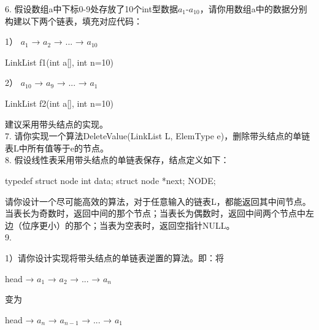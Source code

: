 \begin{exercise}
6. 假设数组a中下标0-9处存放了10个int型数据\(a_1\)-\(a_{10}\)，请你用数组a中的数据分别构建以下两个链表，填充对应代码：

1） \(a_1\) → \(a_2\) → ... → \(a_{10}\)
\begin{cppcode}
    LinkList f1(int a[], int n=10) {

    }
\end{cppcode}
2） \(a_{10}\) → \(a_9\) → ... → \(a_1\)
\begin{cppcode}
    LinkList f2(int a[], int n=10) {

    }
\end{cppcode}
建议采用带头结点的实现。\\

7. 请你实现一个算法DeleteValue(LinkList L, ElemType e)，删除带头结点的单链表L中所有值等于e的节点。\\





8. 假设线性表采用带头结点的单链表保存，结点定义如下：
\begin{cppcode}
    typedef struct node
    {
        int data;
        struct node *next;
    }NODE;
\end{cppcode}
请你设计一个尽可能高效的算法，对于任意输入的链表L，都能返回其中间节点。
当表长为奇数时，返回中间的那个节点；当表长为偶数时，返回中间两个节点中左边（位序更小）的那个；当表为空表时，返回空指针NULL。\\

9. 

1）请你设计实现将带头结点的单链表逆置的算法。即：将
\begin{bulk}
    \begin{center}
        head → \(a_1\) → \(a_2\) → ... → \(a_n\)
    \end{center}
\end{bulk}
变为
\begin{bulk}
    \begin{center}
        head → \(a_n\) → \(a_{n-1}\) → ... → \(a_1\)
    \end{center}
\end{bulk}


\end{exercise}
